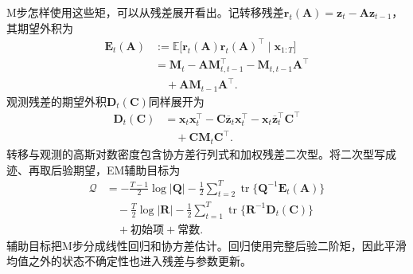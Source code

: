 M步怎样使用这些矩，可以从残差展开看出。记转移残差$\bm r_t(\bm A)=\bm z_t-\bm A\bm z_{t-1}$，其期望外积为
\begin{equation}
  \begin{aligned}
    \bm{E}_t(\bm{A})
      &:=\mathbb{E}\bigl[
        \bm r_t(\bm A)\bm r_t(\bm A)^\top
        \mid\bm{x}_{1:T}\bigr]\\
      &=\bm{M}_t-\bm{A}\bm{M}_{t,t-1}^{\top}
        -\bm{M}_{t,t-1}\bm{A}^{\top}\\
      &\quad{}+\bm{A}\bm{M}_{t-1}\bm{A}^{\top}.
  \end{aligned}
  \label{eq:pgm-dynamic-transition-residual}
\end{equation}
观测残差的期望外积$\bm{D}_t(\bm{C})$同样展开为
\[
  \begin{aligned}
    \bm{D}_t(\bm{C})
      &=\bm{x}_t\bm{x}_t^\top
        -\bm{C}\overline{\bm{z}}_t\bm{x}_t^\top
        -\bm{x}_t\overline{\bm{z}}_t^\top\bm{C}^\top\\
      &\quad{}+\bm{C}\bm{M}_t\bm{C}^\top.
  \end{aligned}
\]
转移与观测的高斯对数密度包含协方差行列式和加权残差二次型。将二次型写成迹、再取后验期望，EM辅助目标为
\begin{equation}
  \begin{aligned}
    \mathcal Q
      &=-\frac{T-1}{2}\log|\bm Q|
        -\frac12\sum_{t=2}^{T}
          \operatorname{tr}\{\bm Q^{-1}\bm E_t(\bm A)\}\\
      &\quad{}-\frac{T}{2}\log|\bm R|
        -\frac12\sum_{t=1}^{T}
          \operatorname{tr}\{\bm R^{-1}\bm D_t(\bm C)\}\\
      &\quad{}+\text{初始项}+\text{常数}.
  \end{aligned}
  \label{eq:pgm-dynamic-lgssm-q}
\end{equation}
辅助目标把M步分成线性回归和协方差估计。回归使用完整后验二阶矩，因此平滑均值之外的状态不确定性也进入残差与参数更新。

